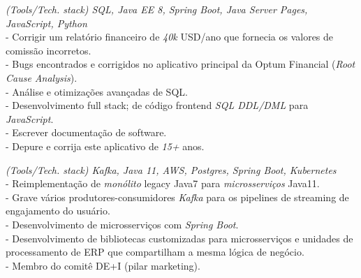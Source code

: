 \documentclass[]{CV-JuanCamiloFlorez}
\begin{document}
\begin{minipage}[t]{0.66\textwidth}
    \noindent
    \textit{(Tools/Tech. stack) SQL, Java EE 8, Spring Boot, Java Server Pages, JavaScript, Python} \\
        - Corrigir um relatório financeiro de \textit{40k} USD/ano que fornecia os valores de comissão incorretos. \\
        - Bugs encontrados e corrigidos no aplicativo principal da Optum Financial (\textit{Root Cause Analysis}). \\
        - Análise e otimizações avançadas de SQL. \\
        - Desenvolvimento full stack; de código frontend \textit{SQL DDL/DML} para \textit{JavaScript}. \\
        - Escrever documentação de software. \\
        - Depure e corrija este aplicativo de \textit{15+} anos. \\
        \sectionsep

    \noindent
    \textit{(Tools/Tech. stack) Kafka, Java 11, AWS, Postgres, Spring Boot, Kubernetes} \\
        - Reimplementação de \textit{monólito} legacy Java7 para \textit{microsserviços} Java11. \\
        - Grave vários produtores-consumidores \textit{Kafka} para os pipelines de streaming de engajamento do usuário. \\
        - Desenvolvimento de microsserviços com \textit{Spring Boot}. \\
        - Desenvolvimento de bibliotecas customizadas para microsserviços e unidades de processamento de ERP que compartilham a mesma lógica de negócio. \\
        - Membro do comitê DE+I (pilar marketing). \\
        \sectionsep


\end{minipage}
\end{document}
